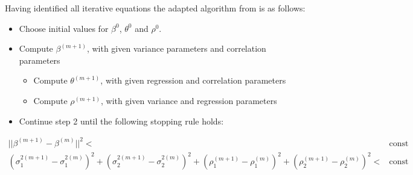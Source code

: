 Having identified all iterative equations the adapted algorithm from
\textcite{Sch12} is as follows:

\begin{itemize}
\itemsep1pt\parskip0pt
\item
  Choose initial values for $\beta^0$, $\theta^0$ and $\rho^0$.
\item
  Compute $\beta^{(m+1)}$, with given variance parameters and
  correlation parameters

  \begin{itemize}
  \itemsep1pt\parskip0pt
  \item
    Compute $\theta^{(m+1)}$, with given regression and correlation
    parameters
  \item
    Compute $\rho^{(m+1)}$, with given variance and regression
    parameters
  \end{itemize}
\item
  Continue step 2 until the following stopping rule holds:
\end{itemize}

\begin{align*}
    ||\beta^{(m+1)}- \beta^{(m)}||^2 <& \text{const} \\
    (\sigma_1^{2(m+1)} - \sigma_1^{2(m)})^2 + (\sigma_2^{2(m+1)} - \sigma_2^{2(m)})^2 + (\rho_1^{(m+1)} - \rho_1^{(m)})^2 + (\rho_2^{(m+1)} - \rho_2^{(m)})^2 <& \text{const}
\end{align*}
